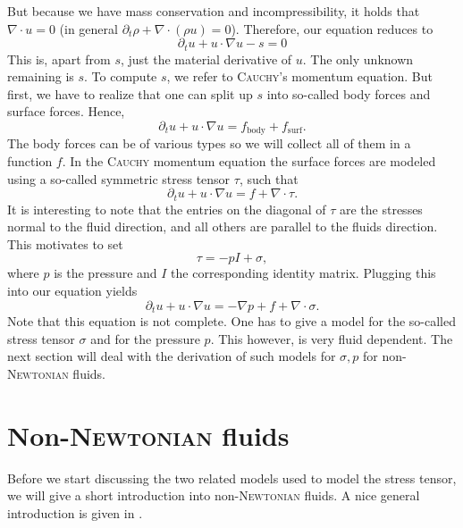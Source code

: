 \documentclass[12pt,a4paper,twoside, open=right]{scrreprt}
\theoremstyle{definition}
\theoremstyle{plain}
\begin{document}
But because we have mass conservation and incompressibility, it holds that $\nabla\cdot u =0$ (in general $\partial_t \rho + \nabla\cdot(\rho u) =0$). Therefore, our equation reduces to 
\begin{equation}
    \partial_t u+ u\cdot \nabla u -s =0
\end{equation}
This is, apart from $s$, just the material derivative of $u$.
The only unknown remaining is $s$. To compute $s$, we refer to \textsc{Cauchy}'s momentum equation. But first, we have to realize that one can split up $s$ into so-called body forces and surface forces. Hence, 
\begin{equation}
   \partial_t u + u\cdot \nabla u = f_{\mathrm{body}} +f_{\mathrm{surf}} .
\end{equation}
The body forces can be of various types so we will collect all of them in a function $f$. In the \textsc{Cauchy} momentum equation the surface forces are modeled using a  so-called symmetric stress tensor $\tau$, such that
\begin{equation}
    \partial_t u + u\cdot \nabla u = f + \nabla\cdot\tau.
\end{equation}
It is interesting to note that the entries on the diagonal of $\tau$ are the stresses normal to the fluid direction, and all others are parallel to the fluids direction. This motivates to set
\begin{equation}
    \tau = -pI+\sigma,
\end{equation}
where $p$ is the pressure and $I$ the corresponding identity matrix. Plugging this into our equation yields
\begin{equation}
    \partial_t u + u\cdot \nabla u = -\nabla p + f + \nabla\cdot\sigma.
\end{equation}
Note that this equation is not complete. One has to give a model for the so-called stress tensor $\sigma$ and for the pressure $p$. This however, is very fluid dependent. The next section will deal with the derivation of such models for $\sigma,p$ for non-\textsc{Newtonian} fluids.
\section{Non-\textsc{Newtonian} fluids}
\label{sec:physics}

Before we start discussing the two related models used to model the stress tensor, we will give a short introduction into non-\textsc{Newtonian} fluids. A nice general introduction is given in \cite{Ouellette2013}.
\end{document}
